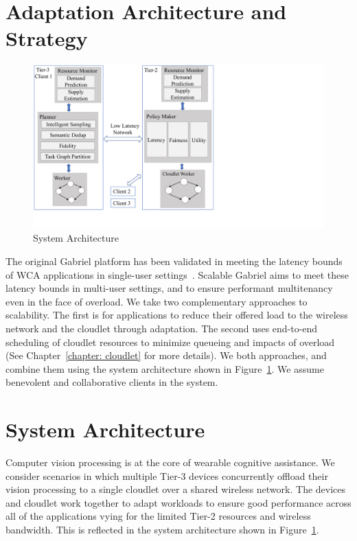 \section{Adaptation Architecture and Strategy}

\begin{figure}[h]
\centering
\includegraphics[width=\textwidth,trim=0 3em 11cm 0, clip]{FIGS/arch-vertical.pdf}
\vspace{-0.3in}
\caption{System Architecture}
\label{fig:arch}
\end{figure}

The original Gabriel platform has been validated in meeting the latency bounds
of WCA applications in single-user settings~\cite{chen2017empirical}.  Scalable
Gabriel aims to meet these latency bounds in multi-user settings, and to ensure
performant multitenancy even in the face of overload.  We take two complementary
approaches to scalability.  The first is for applications to reduce their
offered load to the wireless network and the cloudlet through adaptation.  The
second uses end-to-end scheduling of cloudlet resources to minimize queueing and
impacts of overload (See Chapter~\ref{chapter: cloudlet} for more details).  We
both approaches, and combine them using the system architecture shown in
Figure~\ref{fig:arch}.  We assume benevolent and collaborative clients in the
system.

\section{System Architecture}

Computer vision processing is at the core of wearable cognitive assistance. We
consider scenarios in which multiple Tier-3 devices concurrently offload their
vision processing to a single cloudlet over a shared wireless network.  The
devices and cloudlet work together to adapt workloads to ensure good performance
across all of the applications vying for the limited Tier-2 resources and
wireless bandwidth.  This is reflected in the system architecture shown in
Figure~\ref{fig:arch}.

